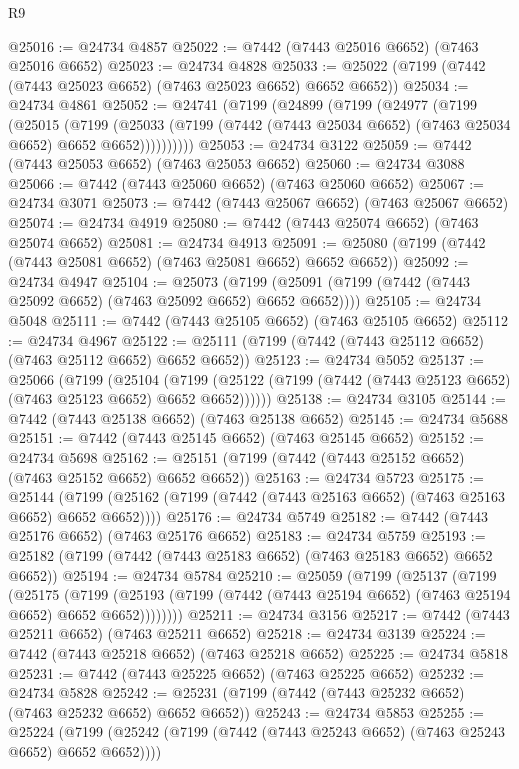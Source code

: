 \begin{lexlean}{R9}
\begin{coremodule}
{{{{{{{{{{{{{{{{{{{{{{{{{{{{{{{{{{{{{{{{{{{{{{{{{{{{{{{{{{{{{{{{{{{{{{{{{{{{{{{{{{{{@25016 := @24734 @4857
@25022 := @7442 (@7443 @25016 @6652) (@7463 @25016 @6652)
@25023 := @24734 @4828
@25033 := @25022 (@7199 (@7442 (@7443 @25023 @6652) (@7463 @25023 @6652) @6652 @6652))
@25034 := @24734 @4861
@25052 := @24741
    (@7199
      (@24899
        (@7199
          (@24977
            (@7199
              (@25015
                (@7199
                  (@25033
                    (@7199 (@7442 (@7443 @25034 @6652) (@7463 @25034 @6652) @6652 @6652))))))))))
@25053 := @24734 @3122
@25059 := @7442 (@7443 @25053 @6652) (@7463 @25053 @6652)
@25060 := @24734 @3088
@25066 := @7442 (@7443 @25060 @6652) (@7463 @25060 @6652)
@25067 := @24734 @3071
@25073 := @7442 (@7443 @25067 @6652) (@7463 @25067 @6652)
@25074 := @24734 @4919
@25080 := @7442 (@7443 @25074 @6652) (@7463 @25074 @6652)
@25081 := @24734 @4913
@25091 := @25080 (@7199 (@7442 (@7443 @25081 @6652) (@7463 @25081 @6652) @6652 @6652))
@25092 := @24734 @4947
@25104 := @25073
    (@7199 (@25091 (@7199 (@7442 (@7443 @25092 @6652) (@7463 @25092 @6652) @6652 @6652))))
@25105 := @24734 @5048
@25111 := @7442 (@7443 @25105 @6652) (@7463 @25105 @6652)
@25112 := @24734 @4967
@25122 := @25111 (@7199 (@7442 (@7443 @25112 @6652) (@7463 @25112 @6652) @6652 @6652))
@25123 := @24734 @5052
@25137 := @25066
    (@7199
      (@25104
        (@7199 (@25122 (@7199 (@7442 (@7443 @25123 @6652) (@7463 @25123 @6652) @6652 @6652))))))
@25138 := @24734 @3105
@25144 := @7442 (@7443 @25138 @6652) (@7463 @25138 @6652)
@25145 := @24734 @5688
@25151 := @7442 (@7443 @25145 @6652) (@7463 @25145 @6652)
@25152 := @24734 @5698
@25162 := @25151 (@7199 (@7442 (@7443 @25152 @6652) (@7463 @25152 @6652) @6652 @6652))
@25163 := @24734 @5723
@25175 := @25144
    (@7199 (@25162 (@7199 (@7442 (@7443 @25163 @6652) (@7463 @25163 @6652) @6652 @6652))))
@25176 := @24734 @5749
@25182 := @7442 (@7443 @25176 @6652) (@7463 @25176 @6652)
@25183 := @24734 @5759
@25193 := @25182 (@7199 (@7442 (@7443 @25183 @6652) (@7463 @25183 @6652) @6652 @6652))
@25194 := @24734 @5784
@25210 := @25059
    (@7199
      (@25137
        (@7199
          (@25175
            (@7199
              (@25193 (@7199 (@7442 (@7443 @25194 @6652) (@7463 @25194 @6652) @6652 @6652))))))))
@25211 := @24734 @3156
@25217 := @7442 (@7443 @25211 @6652) (@7463 @25211 @6652)
@25218 := @24734 @3139
@25224 := @7442 (@7443 @25218 @6652) (@7463 @25218 @6652)
@25225 := @24734 @5818
@25231 := @7442 (@7443 @25225 @6652) (@7463 @25225 @6652)
@25232 := @24734 @5828
@25242 := @25231 (@7199 (@7442 (@7443 @25232 @6652) (@7463 @25232 @6652) @6652 @6652))
@25243 := @24734 @5853
@25255 := @25224
    (@7199 (@25242 (@7199 (@7442 (@7443 @25243 @6652) (@7463 @25243 @6652) @6652 @6652))))
}}}}}}}}}}}}}}}}}}}}}}}}}}}}}}}}}}}}}}}}}}}}}}}}}}}}}}}}}}}}}}}}}}}}}}}}}}}}}}}}}}}}
\end{coremodule}
\end{lexlean}
